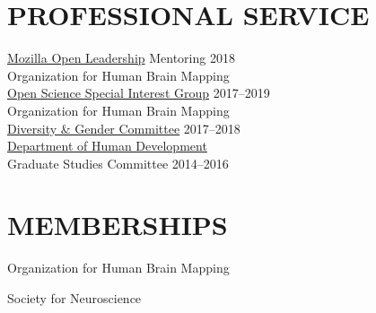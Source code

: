 \documentclass{friggeri-bib}
\begin{document}
\section{PROFESSIONAL SERVICE}

\href{https://foundation.mozilla.org/en/opportunity/mozilla-open-leaders/round-6/}{Mozilla Open Leadership} Mentoring \hfill 2018 \\

Organization for Human Brain Mapping \\ \href{https://www.humanbrainmapping.org/i4a/pages/index.cfm?pageID=3712}{Open Science Special Interest Group}  \hfill 2017--2019 \\

Organization for Human Brain Mapping \\ \href{https://www.humanbrainmapping.org/i4a/pages/index.cfm?pageid=3313}{Diversity \& Gender Committee}  \hfill 2017--2018 \\

\href{http://www.human.cornell.edu/hd/}{Department of Human Development} \\ Graduate Studies Committee  \hfill 2014--2016 \\


\section{MEMBERSHIPS}

Organization for Human Brain Mapping
\vspace{5pt}

Society for Neuroscience
\end{document}
